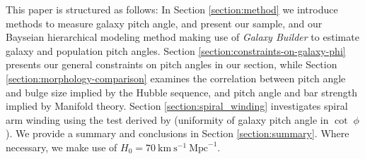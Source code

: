 This paper is structured as follows: In Section \ref{section:method} we introduce methods to measure galaxy pitch angle, and present our sample, and our Bayseian hierarchical modeling method making use of \textit{Galaxy Builder} to estimate galaxy and population pitch angles. Section \ref{section:constraints-on-galaxy-phi} presents our general constraints on pitch angles in our section, while Section \ref{section:morphology-comparison} examines the correlation between pitch angle and bulge size implied by the Hubble sequence, and pitch angle and bar strength implied by Manifold theory. Section \ref{section:spiral_winding} investigates spiral arm winding using the test derived by \cite{2019arXiv190910291P} (uniformity of galaxy pitch angle in $\cot\;\phi$). We provide a summary and conclusions in Section \ref{section:summary}.  Where necessary, we make use of $H_0 = 70\ \text{km}\ \text{s}^{-1}\ \text{Mpc}^{-1}$.
